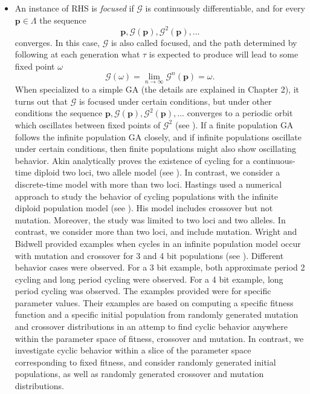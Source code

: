 \begin{itemize}
\item{
An instance of RHS is {\em focused\/} if $\mathcal{G}$ is continuously differentiable, and for every $\bm{p}  \in  \Lambda$
the sequence
\[
\bm{p},  \mathcal{G}(\bm{p}),  {\mathcal{G}}^2(\bm{p}),...
\]
converges. In this case, $\mathcal{G}$ is also called focused, and the path determined by following at each generation what $\tau$ is expected 
to produce will lead to some fixed point $\omega$
\[
\mathcal{G}(\omega) = \lim_{n\to\infty} \mathcal{G}^n(\bm{p}) = \omega.
\]
When specialized to a simple GA (the details are explained in Chapter 2), it turns out that $ \mathcal{G}$ is focused under certain conditions, 
but under other conditions the sequence 
$\bm{p},  \mathcal{G}(\bm{p}),  {\mathcal{G}}^2(\bm{p}),...$ converges 
to a periodic orbit which oscillates between fixed points of $\mathcal{G}^2$ (see \cite{Vose1999}). 
If a finite population GA follows the infinite population GA closely, and if infinite populations oscillate under certain conditions, then 
finite populations might also show oscillating behavior. 
Akin analytically proves the existence of cycling for a continuous-time diploid two loci, two allele model (see \cite{Akin1982}). 
In contrast, we consider a discrete-time model with more than two loci. 
Hastings used a numerical approach to study 
the behavior of cycling populations with the infinite diploid population model (see \cite{Hastings1981}). 
His model includes crossover but not mutation. 
Moreover, the study was limited to two loci and two alleles. 
In contrast, we consider more than two loci, and include mutation. 
Wright and Bidwell provided examples when cycles in an infinite population model occur with mutation and 
crossover for 3 and 4 bit populations (see \cite{Wright1997}). 
Different behavior cases were observed. 
For a 3 bit example, both approximate period 2 cycling and long period cycling were observed. 
For a 4 bit example, long period cycling was observed. 
The examples provided were for specific 
parameter values. 
Their examples are based on computing a specific fitness function and a specific initial population from randomly generated 
mutation and crossover distributions in an attemp to find cyclic behavior anywhere within the parameter space of fitness, 
crossover and mutation. 
In contrast, we investigate cyclic behavior within a slice of the parameter space corresponding to fixed fitness, and consider 
randomly generated initial populations, as well as randomly generated crossover and mutation distributions.

}
\end{itemize}
